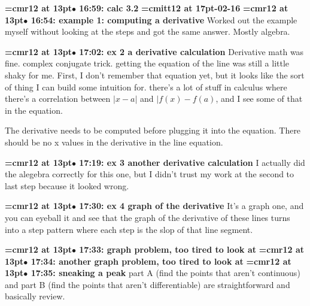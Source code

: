 {\smallskip\noindent\bf\font\titlefont=cmr12 at 13pt\titlefont $\bullet$ 16:59: calc 3.2}\smallskip
{\medskip\noindent\bf\font\titlefont=cmitt12 at 17pt-02-16}\medskip
{\smallskip\noindent\bf\font\titlefont=cmr12 at 13pt\titlefont $\bullet$ 16:54: example 1: computing a derivative}\smallskip
Worked out the example myself without looking at the steps and got the same answer. Mostly algebra.
\par

{\smallskip\noindent\bf\font\titlefont=cmr12 at 13pt\titlefont $\bullet$ 17:02: ex 2 a derivative calculation}\smallskip
Derivative math was fine. complex conjugate trick. getting the equation of the line was still a little shaky for me. First, I don't remember that equation yet, but it looks like the sort of thing I can build some intuition for. there's a lot of stuff in calculus where there's a correlation between $|x - a|$ and $|f(x) - f(a)$, and I see some of that in the equation.
\par

The derivative needs to be computed before plugging it into the equation. There should be no x values in the derivative in the line equation.
\par

{\smallskip\noindent\bf\font\titlefont=cmr12 at 13pt\titlefont $\bullet$ 17:19: ex 3 another derivative calculation}\smallskip
I actually did the alegebra correctly for this one, but I didn't trust my work at the second to last step because it looked wrong.
\par

{\smallskip\noindent\bf\font\titlefont=cmr12 at 13pt\titlefont $\bullet$ 17:30: ex 4 graph of the derivative}\smallskip
It's a graph one, and you can eyeball it and see that the graph of the derivative of these lines turns into a step pattern where each step is the slop of that line segment.
\par

{\smallskip\noindent\bf\font\titlefont=cmr12 at 13pt\titlefont $\bullet$ 17:33: graph problem, too tired to look at}\smallskip
{\smallskip\noindent\bf\font\titlefont=cmr12 at 13pt\titlefont $\bullet$ 17:34: another graph problem, too tired to look at}\smallskip
{\smallskip\noindent\bf\font\titlefont=cmr12 at 13pt\titlefont $\bullet$ 17:35: sneaking a peak}\smallskip
part A (find the points that aren't continuous) and part B (find the points that aren't differentiable) are straightforward and basically review.
\par

